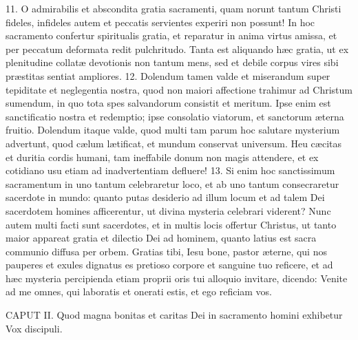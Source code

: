 \documentclass[twoside]{article}
\begin{document}
11. O admirabilis et abscondita gratia sacramenti, quam norunt tantum Christi fideles, infideles autem et peccatis servientes experiri non possunt! In hoc sacramento confertur spiritualis gratia, et reparatur in anima virtus amissa, et per peccatum deformata redit pulchritudo. Tanta est aliquando hæc gratia, ut ex plenitudine collatæ devotionis non tantum mens, sed et debile corpus vires sibi præstitas sentiat ampliores.
12. Dolendum tamen valde et miserandum super tepiditate et neglegentia nostra, quod non maiori affectione trahimur ad Christum sumendum, in quo tota spes salvandorum consistit et meritum. Ipse enim est sanctificatio nostra et redemptio; ipse consolatio viatorum, et sanctorum æterna fruitio. Dolendum itaque valde, quod multi tam parum hoc salutare mysterium advertunt, quod cælum lætificat, et mundum conservat universum. Heu cæcitas et duritia cordis humani, tam ineffabile donum non magis attendere, et ex cotidiano usu etiam ad inadvertentiam defluere!
13. Si enim hoc sanctissimum sacramentum in uno tantum celebraretur loco, et ab uno tantum consecraretur sacerdote in mundo: quanto putas desiderio ad illum locum et ad talem Dei sacerdotem homines afficerentur, ut divina mysteria celebrari viderent? Nunc autem multi facti sunt sacerdotes, et in multis locis offertur Christus, ut tanto maior appareat gratia et dilectio Dei ad hominem, quanto latius est sacra communio diffusa per orbem. Gratias tibi, Iesu bone, pastor æterne, qui nos pauperes et exules dignatus es pretioso corpore et sanguine tuo reficere, et ad hæc mysteria percipienda etiam proprii oris tui alloquio invitare, dicendo: Venite ad me omnes, qui laboratis et onerati estis, et ego reficiam vos.


CAPUT II.
Quod magna bonitas et caritas Dei in sacramento homini exhibetur
Vox discipuli.
\end{document}
